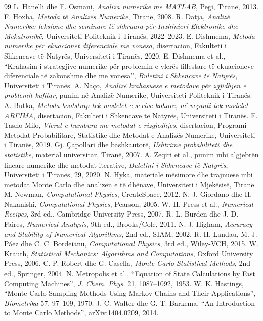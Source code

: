 \documentclass[11pt,oneside,openany]{book}
\begin{document}
\begin{thebibliography}{99}
 L. Hanelli dhe F. Osmani, \emph{Analiza numerike me MATLAB}, Pegi, Tiranë, 2013.
 F. Hoxha, \emph{Metoda të Analizës Numerike}, Tiranë, 2008.
 R. Datja, \emph{Analizë Numerike: leksione dhe seminare të shkruara për Inxhinieri Elektronike dhe Mekatronikë}, Universiteti Politeknik i Tiranës, 2022--2023.
 E. Dishmema, \emph{Metoda numerike për ekuacionet diferenciale me vonesa}, disertacion, Fakulteti i Shkencave të Natyrës, Universiteti i Tiranës, 2020.
 E. Dishmema et al., ``Krahasim i strategjive numerike për problemin e vlerës fillestare të ekuacioneve diferenciale të zakonshme dhe me vonesa'', \emph{Buletini i Shkencave të Natyrës}, Universiteti i Tiranës.
 A. Naço, \emph{Analizë krahasuese e metodave për zgjidhjen e problemit kufitar}, punim në Analizë Numerike, Universiteti Politeknik i Tiranës.
 A. Butka, \emph{Metoda bootstrap tek modelet e serive kohore, në veçanti tek modelet ARFIMA}, disertacion, Fakulteti i Shkencave të Natyrës, Universiteti i Tiranës.
 E. Tasho Milo, \emph{Vlerat e humbura me metodat e rizgjedhjes}, disertacion, Programi Metodat Probabilitare, Statistike dhe Metodat e Analizës Numerike, Universiteti i Tiranës, 2019.
 Gj. Çapollari dhe bashkautorë, \emph{Ushtrime probabiliteti dhe statistike}, material universitar, Tiranë, 2007.
 A. Zeqiri et al., punim mbi algjebrën lineare numerike dhe metodat iterative, \emph{Buletini i Shkencave të Natyrës}, Universiteti i Tiranës, 29, 2020.
 N. Hyka, materiale mësimore dhe trajnuese mbi metodat Monte Carlo dhe analizën e të dhënave, Universiteti i Mjekësisë, Tiranë.
 M. Newman, \emph{Computational Physics}, CreateSpace, 2012.
 N. J. Giordano dhe H. Nakanishi, \emph{Computational Physics}, Pearson, 2005.
 W. H. Press et al., \emph{Numerical Recipes}, 3rd ed., Cambridge University Press, 2007.
 R. L. Burden dhe J. D. Faires, \emph{Numerical Analysis}, 9th ed., Brooks/Cole, 2011.
 N. J. Higham, \emph{Accuracy and Stability of Numerical Algorithms}, 2nd ed., SIAM, 2002.
 R. H. Landau, M. J. Páez dhe C. C. Bordeianu, \emph{Computational Physics}, 3rd ed., Wiley-VCH, 2015.
 W. Krauth, \emph{Statistical Mechanics: Algorithms and Computations}, Oxford University Press, 2006.
 C. P. Robert dhe G. Casella, \emph{Monte Carlo Statistical Methods}, 2nd ed., Springer, 2004.
 N. Metropolis et al., ``Equation of State Calculations by Fast Computing Machines'', \emph{J. Chem. Phys.} 21, 1087--1092, 1953.
 W. K. Hastings, ``Monte Carlo Sampling Methods Using Markov Chains and Their Applications'', \emph{Biometrika} 57, 97--109, 1970.
 J.-C. Walter dhe G. T. Barkema, ``An Introduction to Monte Carlo Methods'', arXiv:1404.0209, 2014.
\end{thebibliography}
\end{document}

